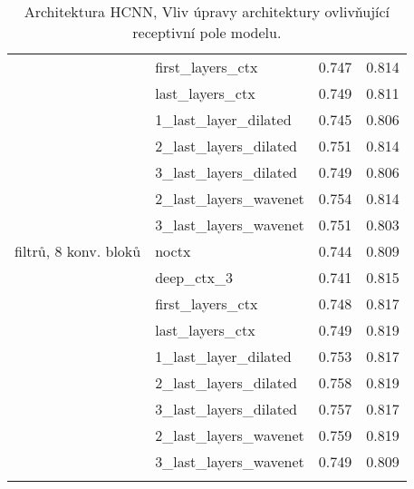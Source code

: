 \documentclass[12pt,a4paper,twoside,openright]{report}
\let\openright=\cleardoublepage
\begin{document}
\begin{table}[h]
{\begin{tabular}{llrr}
{} & first\_layers\_ctx & 0.747 & 0.814 \\
{} & last\_layers\_ctx & 0.749 & 0.811 \\
{} & 1\_last\_layer\_dilated & 0.745 & 0.806 \\
{} & 2\_last\_layers\_dilated & 0.751 & 0.814 \\
{} & 3\_last\_layers\_dilated & 0.749 & 0.806 \\
{} & 2\_last\_layers\_wavenet & 0.754 & 0.814 \\
{} & 3\_last\_layers\_wavenet & 0.751 & 0.803 \\
\arrayrulecolor{black!30}\midrule
16 filtrů, 8 konv. bloků & noctx & 0.744 & 0.809 \\
{} & deep\_ctx\_3 & 0.741 & 0.815 \\
{} & first\_layers\_ctx & 0.748 & 0.817 \\
{} & last\_layers\_ctx & 0.749 & 0.819 \\
{} & 1\_last\_layer\_dilated & 0.753 & 0.817 \\
{} & 2\_last\_layers\_dilated & 0.758 & 0.819 \\
{} & 3\_last\_layers\_dilated & 0.757 & 0.817 \\
{} & 2\_last\_layers\_wavenet & 0.759 & 0.819 \\
{} & 3\_last\_layers\_wavenet & 0.749 & 0.809 \\
\arrayrulecolor{black}\bottomrule
\end{tabular}
}%
\caption{Architektura HCNN, Vliv úpravy architektury ovlivňující receptivní pole modelu.}\label{tab:spectrogram_ctx_archs}
\end{table}

\openright
\end{document}
